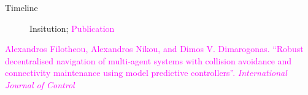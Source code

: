 \begin{frame}{Timeline}

\begin{figure}[t!] \centering
        
        \caption{\textcolor[RGB]{32,74,135}{Insitution}; \textcolor{magenta}{Publication}}
\end{figure}

\placebottom \tiny
\textcolor{magenta}{Alexandros Filotheou, Alexandros Nikou, and Dimos V. Dimarogonas. ``Robust decentralised
navigation of multi-agent systems with collision avoidance and connectivity maintenance using model
predictive controllers”. \textit{International Journal of Control}}

\end{frame}
